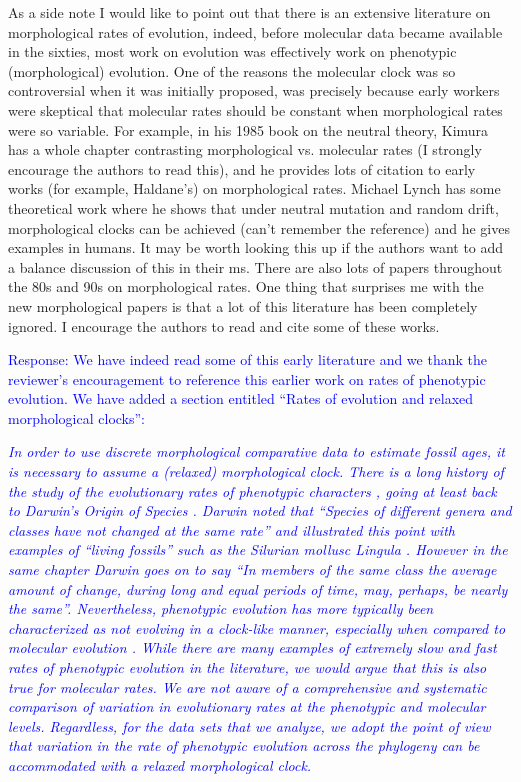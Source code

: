 \documentclass[11pt]{article}
\newcommand{\response}[1]{\medskip{}\textcolor{blue}{{Response: #1}}\medskip{}}
\newcommand{\respquote}[1]{{\medskip{}\textcolor{blue}{{\it #1}}\medskip{}}}
\begin{document}
As a side note I would like to point out that there is an extensive literature on morphological rates of evolution, indeed, before molecular data became available in the sixties, most work on evolution was effectively work on phenotypic (morphological) evolution. One of the reasons the molecular clock was so controversial when it was initially proposed, was precisely because early workers were skeptical that molecular rates should be constant when morphological rates were so variable. For example, in his 1985 book on the neutral theory, Kimura has a whole chapter contrasting morphological vs. molecular rates (I strongly encourage the authors to read this), and he provides lots of citation to early works (for example, Haldane's) on morphological rates. Michael Lynch has some theoretical work where he shows that under neutral mutation and random drift, morphological clocks can be achieved (can't remember the reference) and he gives examples in humans. It may be worth looking this up if the authors want to add a balance discussion of this in their ms. There are also lots of papers throughout the 80s and 90s on morphological rates. One thing that surprises me with the new morphological papers is that a lot of this literature has been completely ignored. I encourage the authors to read and cite some of these works.

\response{We have indeed read some of this early literature and we thank the reviewer's encouragement to reference this earlier work on rates of phenotypic evolution. We have added a section entitled ``Rates of evolution and relaxed morphological clocks'':}

\respquote{In order to use discrete morphological comparative data to estimate fossil ages, it is necessary to assume a (relaxed) morphological clock. There is a long history of the study of the evolutionary rates of phenotypic characters \cite{Simpson1944,Haldane1949,Simpson1953,Gingerich1983,Gingerich1993}, going at least back to Darwin's Origin of Species \cite{Darwin1859}. Darwin noted that {\it ``Species of different genera and classes have not changed at the same rate''} and illustrated this point with examples of ``living fossils'' such as the Silurian mollusc {\it Lingula} \cite{Darwin1859}. However in the same chapter Darwin goes on to say {\it ``In members of the same class the average amount of change, during long and equal periods of time, may, perhaps, be nearly the same''}. Nevertheless, phenotypic evolution has more typically been characterized as not evolving in a clock-like manner, especially when compared to molecular evolution \cite{Kimura1983}. While there are many examples of extremely slow and fast rates of phenotypic evolution in the literature, we would argue that this is also true for molecular rates. We are not aware of a comprehensive and systematic comparison of variation in evolutionary rates at the phenotypic and molecular levels. Regardless, for the data sets that we analyze, we adopt the point of view that variation in the rate of phenotypic evolution across the phylogeny can be accommodated with a relaxed morphological clock.
}
\end{document}
